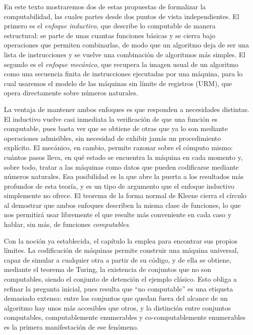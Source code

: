 En este texto mostraremos dos de estas propuestas de formalizar la computabilidad, las cuales partes desde dos puntos de vista independientes. El primero es el \emph{enfoque inductivo}, que describe lo computable de manera estructural: se parte de unas cuantas funciones básicas y se cierra bajo operaciones que permiten combinarlas, de modo que un algoritmo deja de ser una lista de instrucciones y se vuelve una combinación de algoritmos más simples. El segundo es el \emph{enfoque mecánico}, que recupera la imagen usual de un algoritmo como una secuencia finita de instrucciones ejecutadas por una máquina, para lo cual usaremos el modelo de las máquinas sin límite de registros (URM), que opera directamente sobre números naturales.

La ventaja de mantener ambos enfoques es que responden a necesidades distintas. El inductivo vuelve casi inmediata la verificación de que una función es computable, pues basta ver que se obtiene de otras que ya lo son mediante operaciones admisibles, sin necesidad de exhibir jamás un procedimiento explícito. El mecánico, en cambio, permite razonar sobre el cómputo mismo: cuántos pasos lleva, en qué estado se encuentra la máquina en cada momento y, sobre todo, tratar a las máquinas como datos que pueden codificarse mediante números naturales. Esa posibilidad es la que abre la puerta a los resultados más profundos de esta teoría, y es un tipo de argumento que el enfoque inductivo simplemente no ofrece. El teorema de la forma normal de Kleene cierra el círculo al demostrar que ambos enfoques describen la misma clase de funciones, lo que nos permitirá usar libremente el que resulte más conveniente en cada caso y hablar, sin más, de funciones \emph{computables}.

Con la noción ya establecida, el capítulo la emplea para encontrar sus propios límites. La codificación de máquinas permite construir una máquina universal, capaz de simular a cualquier otra a partir de su código, y de ella se obtiene, mediante el teorema de Turing, la existencia de conjuntos que no son computables, siendo el conjunto de detención el ejemplo clásico. Esto obliga a refinar la pregunta inicial, pues resulta que ``no computable'' es una etiqueta demasiado extensa: entre los conjuntos que quedan fuera del alcance de un algoritmo hay unos más accesibles que otros, y la distinción entre conjuntos computables, computablemente enumerables y co-computablemente enumerables es la primera manifestación de ese fenómeno.

